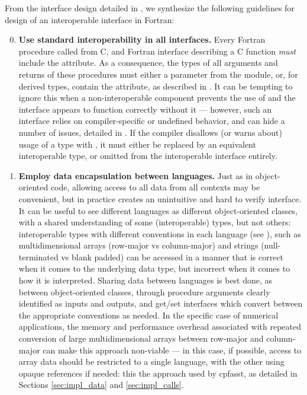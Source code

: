 From the interface design detailed in , we synthesize the following guidelines for design of an interoperable interface in Fortran:
\begin{enumerate}
  	\setcounter{enumi}{-1}
	\item \textbf{Use standard interoperability in all interfaces.} Every Fortran procedure called from C, and Fortran interface describing a C function \textit{must} include the  attribute. As a consequence, the types of all arguments and returns of these procedures must either a  parameter from the  module, or, for derived types, contain the  attribute, as described in . It can be tempting to ignore this when a non-interoperable component prevents the use of  and the interface appears to function correctly without it --- however, such an interface relies on compiler-specific or undefined behavior, and can hide a number of issues, detailed in . If the compiler disallows (or warns about) usage of a type with , it must either be replaced by an equivalent interoperable type, or omitted from the interoperable interface entirely.
	\item \textbf{Employ data encapsulation between languages.} Just as in object-oriented code, allowing access to all data from all contexts may be convenient, but in practice creates an unintuitive and hard to verify interface. It can be useful to see different languages as different object-oriented classes, with a shared understanding of some (interoperable) types, but not others: interoperable types with different conventions in each language (see ), such as multidimensional arrays (row-major vs column-major) and strings (null-terminated vs blank padded) can be accessed in a manner that is correct when it comes to the underlying data type, but incorrect when it comes to how it is interpreted. Sharing data between languages is best done, as between object-oriented classes, through procedure arguments clearly identified as inputs and outputs, and get/set interfaces which convert between the appropriate conventions as needed. In the specific case of numerical applications, the memory and performance overhead associated with repeated conversion of large multidimensional arrays between row-major and column-major can make this approach non-viable --- in this case, if possible, access to array data should be restricted to a single language, with the other using opaque references if needed: this the approach used by cpfasst, as detailed in Sections \ref{sec:impl_data} and \ref{sec:impl_calls}.

\end{enumerate}
